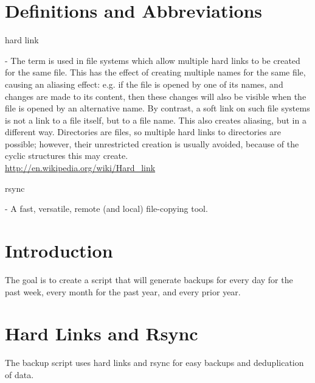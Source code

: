 \documentclass[12pt,letterpaper,dvips]{article}
\newenvironment{itemize*}%
  {\begin{itemize}%
    \setlength{\itemsep}{0pt}%
    \setlength{\parsep}{0pt}}%
  {\end{itemize}}
\begin{document}
\section*{Definitions and Abbreviations}
\begin{itemize*}
  \item{\begin{bf}hard link\end{bf}} - The term is used in file systems which allow multiple hard
    links to be created for the same file. This has the effect of creating multiple names for the
    same file, causing an aliasing effect: e.g. if the file is opened by one of its names, and
    changes are made to its content, then these changes will also be visible when the file is
    opened by an alternative name.  By contrast, a soft link on such file systems is not a link to
    a file itself, but to a file name. This also creates aliasing, but in a different way.
    Directories are files, so multiple hard links to directories are possible; however, their
    unrestricted creation is usually avoided, because of the cyclic structures this may create.\\
    \href{http://en.wikipedia.org/wiki/Hard_link}{http://en.wikipedia.org/wiki/Hard\_link}

  \item{\begin{bf}rsync\end{bf}} - A fast, versatile, remote (and local) file-copying tool.
\end{itemize*}


\newpage
\section{Introduction}
The goal is to create a script that will generate backups for every day for the past
week, every month for the past year, and every prior year.


\newpage
\section{Hard Links and Rsync}
The backup script uses hard links and rsync for easy backups and deduplication of data.

\end{document}
